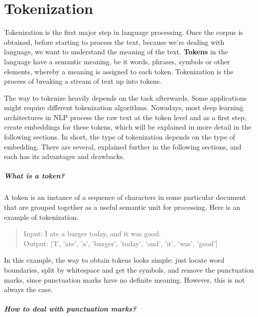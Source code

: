 %
%

\chapter{Tokenization}\label{sec:tokenization}

Tokenization is the first major step in language processing. Once the corpus is obtained, before starting to process the text, because we're dealing with language, we want to understand the meaning of the text. \textbf{Tokens} in the language have a semantic meaning, be it words, phrases, symbols or other elements, whereby a meaning is assigned to each token. Tokenization is the process of breaking a stream of text up into tokens.~\cite{manning2008introduction}

The way to tokenize heavily depends on the task afterwards. Some applications might require different tokenization algorithms. Nowadays, most deep learning architectures in NLP process the raw text at the token level and as a first step, create embeddings for these tokens, which will be explained in more detail in the following sections. In short, the type of tokenization depends on the type of embedding. There are several, explained further in the following sections, and each has its advantages and drawbacks.

\paragraph{What is a token?}

A token is an instance of a sequence of characters in some particular document that are grouped together as a useful semantic unit for processing. Here is an example of tokenization.

\begin{quote}
    Input: I ate a burger today, and it was good.\\
    Output: ['I', 'ate', 'a', 'burger', 'today', 'and', 'it', 'was', 'good']
\end{quote}

In this example, the way to obtain tokens looks simple: just locate word boundaries, split by whitespace and get the symbols, and remove the punctuation marks, since punctuation marks have no definite meaning. However, this is not always the case.

\paragraph{How to deal with punctuation marks?}

